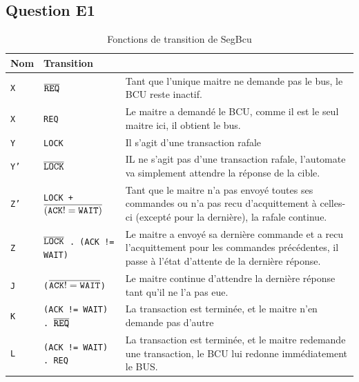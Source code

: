 \documentclass{article}
\begin{document}
\subsection{Question E1}

\begin{table}[H]
\centering
\begingroup
\setlength{\tabcolsep}{5pt}
\renewcommand{\arraystretch}{1.1}
\begin{tabular}{ | l | l | p{10cm} |}
\hline
Nom    &   Transition  \\
\hline
\tt{X}      & \tt{$\overline{\tt{REQ}}$} &
Tant que l'unique maitre ne demande pas le bus, le BCU reste inactif. \\
\hline

\tt{X}      & \tt{REQ} &
Le maitre a demandé le BCU, comme il est le seul maitre ici, il obtient le bus. \\
\hline

\tt{Y}      & \tt{LOCK} &
Il s'agit d'une transaction rafale \\
\hline

\tt{Y'}      & \tt{$\overline{\tt{LOCK}}$} &
IL ne s'agit pas d'une transaction rafale, l'automate va simplement attendre
la réponse de la cible. \\
\hline

\tt{Z'}      & \tt{LOCK + $\overline{\tt{(ACK != WAIT)}}$} &
Tant que le maitre n'a pas envoyé toutes ses commandes ou n'a pas recu
d'acquittement à celles-ci (excepté pour la dernière), la rafale continue. \\
\hline

\tt{Z}      & \tt{$\overline{\tt{LOCK}}$ . \tt{(ACK != WAIT)}} &
Le maitre a envoyé sa dernière commande et a recu l'acquittement pour les
commandes précédentes, il passe à l'état d'attente de la dernière réponse. \\
\hline

\tt{J}      & \tt{($\overline{\tt{ACK != WAIT}}$)} &
Le maitre continue d'attendre la dernière réponse tant qu'il ne l'a pas eue. \\
\hline

\tt{K}      & \tt{(ACK != WAIT) . $\overline{\tt{REQ}}$} &
La transaction est terminée, et le maitre n'en demande pas d'autre \\
\hline

\tt{L}      & \tt{(ACK != WAIT) . REQ} &
La transaction est terminée, et le maitre redemande une transaction, le BCU
lui redonne immédiatement le BUS. \\

\hline
\end{tabular}
\endgroup
\caption{Fonctions de transition de SegBcu}
\end{table}
\end{document}
